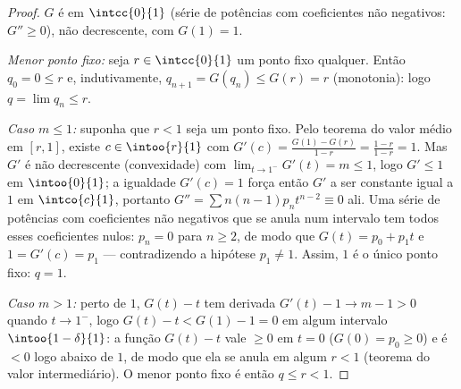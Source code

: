 \begin{proof}
$G$ é  em $\intcc{0}{1}$ (série de potências com coeficientes
não negativos: $G'' \geq 0$), não decrescente, com $G(1) = 1$.

\emph{Menor ponto fixo:} seja $r \in \intcc{0}{1}$ um ponto fixo
qualquer. Então $q_0 = 0 \leq r$ e, indutivamente, $q_{n+1} = G(q_n)
\leq G(r) = r$ (monotonia): logo $q = \lim q_n \leq r$.

\emph{Caso $m \leq 1$:} suponha que $r < 1$ seja um ponto fixo. Pelo
teorema do valor médio em $[r, 1]$, existe $c \in \intoo{r}{1}$ com
$G'(c) = \frac{G(1) - G(r)}{1 - r} = \frac{1 - r}{1 - r} = 1$. Mas
$G'$ é não decrescente (convexidade) com $\lim_{t\to1^-}G'(t) = m
\leq 1$, logo $G' \leq 1$ em $\intoo{0}{1}$; a igualdade $G'(c) =
1$ força então $G'$ a ser constante igual a $1$ em $\intco{c}{1}$,
portanto $G'' = \sum n(n-1)p_nt^{n-2} \equiv 0$ ali. Uma série de potências
com coeficientes não negativos que se anula num intervalo tem todos
esses coeficientes nulos: $p_n = 0$ para $n \geq 2$, de modo que $G(t) = p_0
+ p_1t$ e $1 = G'(c) = p_1$ --- contradizendo a hipótese
$p_1 \neq 1$. Assim, $1$ é o único ponto fixo: $q = 1$.

\emph{Caso $m > 1$:} perto de $1$, $G(t) - t$ tem derivada $G'(t) -
1 \to m - 1 > 0$ quando $t \to 1^-$, logo $G(t) - t < G(1) - 1 = 0$ em
algum intervalo $\intoo{1 - \delta}{1}$: a função 
$G(t) - t$ vale $\geq 0$ em $t = 0$ ($G(0) = p_0 \geq 0$) e é $< 0$
logo abaixo de $1$, de modo que ela se anula em algum $r < 1$ (teorema do valor
intermediário). O menor ponto fixo é então $q \leq r < 1$.
\end{proof}


